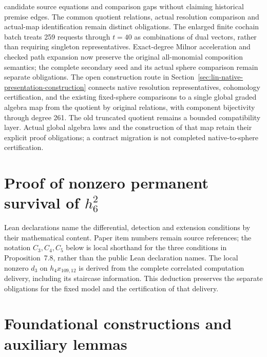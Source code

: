 candidate source equations and comparison gaps without claiming historical
premise edges. The common quotient relations, actual resolution comparison
and actual-map identification remain distinct obligations. The enlarged
finite cochain batch treats 259 requests through $t=40$ as combinations of
dual vectors, rather than requiring singleton representatives.
Exact-degree Milnor acceleration and checked path expansion now preserve the
original all-monomial composition semantics; the complete secondary seed and
its actual sphere comparison remain separate obligations.
The open construction route in
Section~\ref{sec:lin-native-presentation-construction} connects native
resolution representatives, cohomology certification, and the existing
fixed-sphere comparisons to a single global graded algebra map from the
quotient by original relations, with component bijectivity through degree
261. The old truncated quotient remains a bounded compatibility layer.
Actual global algebra laws and the construction of that map retain their
explicit proof obligations; a contract migration is not completed
native-to-sphere certification.



\chapter{Proof of nonzero permanent survival of $h_6^2$}
\label{chap:near126-proof-main}
Lean declarations name the differential, detection and extension conditions
by their mathematical content. Paper item numbers remain source references;
the notation $C_3,C_4,C_5$ below is local shorthand for the three conditions
in Proposition~7.8, rather than the public Lean declaration names.
The local nonzero $d_3$ on $h_4x_{109,12}$ is derived from the complete
correlated computation delivery, including its staircase information.
This deduction preserves the separate obligations for the fixed model and
the certification of that delivery.





\appendix
\chapter{Foundational constructions and auxiliary lemmas}
\label{chap:mathematical-foundations-appendix}



